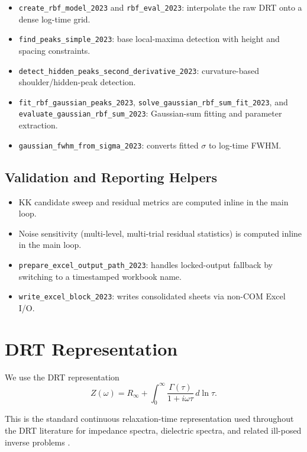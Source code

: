 \documentclass[11pt]{article}
\begin{document}
\begin{itemize}
\item \texttt{create\_rbf\_model\_2023} and \texttt{rbf\_eval\_2023}: interpolate the raw DRT onto a dense log-time grid.
\item \texttt{find\_peaks\_simple\_2023}: base local-maxima detection with height and spacing constraints.
\item \texttt{detect\_hidden\_peaks\_second\_derivative\_2023}: curvature-based shoulder/hidden-peak detection.
\item \texttt{fit\_rbf\_gaussian\_peaks\_2023}, \texttt{solve\_gaussian\_rbf\_sum\_fit\_2023}, and \texttt{evaluate\_gaussian\_rbf\_sum\_2023}: Gaussian-sum fitting and parameter extraction.
\item \texttt{gaussian\_fwhm\_from\_sigma\_2023}: converts fitted $\sigma$ to log-time FWHM.
\end{itemize}

\subsection*{Validation and Reporting Helpers}

\begin{itemize}
\item KK candidate sweep and residual metrics are computed inline in the main loop.
\item Noise sensitivity (multi-level, multi-trial residual statistics) is computed inline in the main loop.
\item \texttt{prepare\_excel\_output\_path\_2023}: handles locked-output fallback by switching to a timestamped workbook name.
\item \texttt{write\_excel\_block\_2023}: writes consolidated sheets via non-COM Excel I/O.
\end{itemize}

\section{DRT Representation}

We use the DRT representation
\begin{equation}
Z(\omega) = R_{\infty} + \int_0^{\infty} \frac{\Gamma(\tau)}{1 + i\omega\tau} \, d\ln \tau.
\end{equation}

This is the standard continuous relaxation-time representation used throughout the DRT literature for impedance spectra, dielectric spectra, and related ill-posed inverse problems \cite{saccoccio2014,ivertiffee2017,boukamp2017,cordoba2018,macutkevic2004}.
\end{document}
